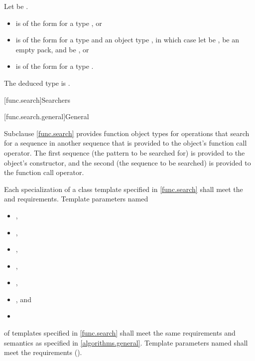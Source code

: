 \begin{itemdescr}
\pnum
Let  be .

\pnum
\constraints
\begin{itemize}
\item
{} is of the form
 for a type , or
\item
{} is of the form
 for a type  and an object type ,
in which case
let  be ,
 be an empty pack, and
 be , or
\item
{} is of the form
 for a type .
\end{itemize}

\pnum
\remarks
The deduced type is .
\end{itemdescr}

[func.search]{Searchers}

[func.search.general]{General}

\pnum
Subclause \ref{func.search} provides function object types for
operations that search for a sequence  in another
sequence  that is provided to the object's function call
operator.  The first sequence (the pattern to be searched for) is provided to
the object's constructor, and the second (the sequence to be searched) is
provided to the function call operator.

\pnum
Each specialization of a class template specified in \ref{func.search}
shall meet the  and  requirements.
Template parameters named
\begin{itemize}
\item {},
\item {},
\item {},
\item {},
\item {},
\item {}, and
\item {}
\end{itemize}
of templates specified in
\ref{func.search} shall meet the same requirements and semantics as
specified in \ref{algorithms.general}.
Template parameters named  shall meet the 
requirements ().

